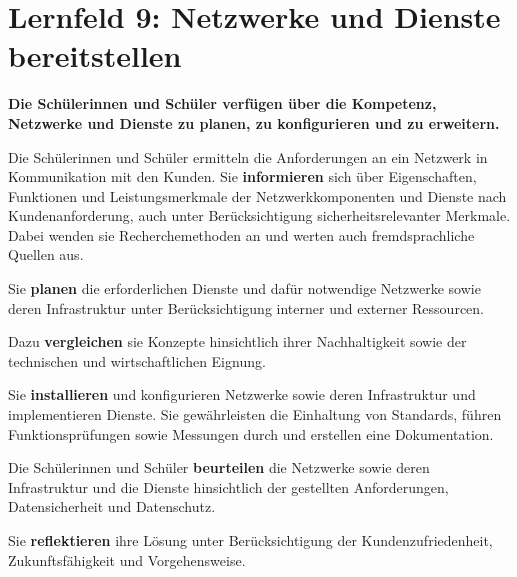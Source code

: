 \chapter{Lernfeld 9: Netzwerke und Dienste bereitstellen}

\textbf{Die Schülerinnen und Schüler verfügen über die Kompetenz, Netzwerke und Dienste
    zu planen, zu konfigurieren und zu erweitern.}

Die Schülerinnen und Schüler ermitteln die Anforderungen an ein Netzwerk in Kommunikation mit den Kunden. Sie \textbf{informieren} sich über Eigenschaften, Funktionen und Leistungsmerkmale der Netzwerkkomponenten und Dienste nach Kundenanforderung, auch unter
Berücksichtigung sicherheitsrelevanter Merkmale. Dabei wenden sie Recherchemethoden
an und werten auch fremdsprachliche Quellen aus.

Sie \textbf{planen} die erforderlichen Dienste und dafür notwendige Netzwerke sowie deren Infrastruktur unter Berücksichtigung interner und externer Ressourcen.

Dazu \textbf{vergleichen} sie Konzepte hinsichtlich ihrer Nachhaltigkeit sowie der technischen und
wirtschaftlichen Eignung.

Sie \textbf{installieren} und konfigurieren Netzwerke sowie deren Infrastruktur und implementieren
Dienste. Sie gewährleisten die Einhaltung von Standards, führen Funktionsprüfungen sowie
Messungen durch und erstellen eine Dokumentation.

Die Schülerinnen und Schüler \textbf{beurteilen} die Netzwerke sowie deren Infrastruktur und die
Dienste hinsichtlich der gestellten Anforderungen, Datensicherheit und Datenschutz.

Sie \textbf{reflektieren} ihre Lösung unter Berücksichtigung der Kundenzufriedenheit, Zukunftsfähigkeit und Vorgehensweise.

